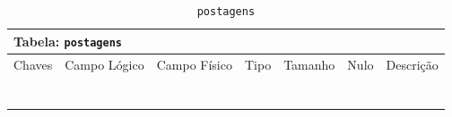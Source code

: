 \documentclass[12pt,a4paper]{article}
\begin{document}
\begin{center}
\begin{table}[h!]
	\caption{\texttt{postagens}}
	\label{tabela:postagens}
	\begin{tabular}{|p{1cm}|p{1.5cm}|p{1.25cm}|p{1.25cm}|p{1.75cm}|p{1.25cm}|p{4.5cm}|}\hline	
		\multicolumn{7}{|p{16cm}|}{\cellcolor{cinzaClaro}  \centering Tabela: \texttt{postagens}} \\ \hline %
		{\small Chaves} & {\small Campo Lógico} & {\small Campo Físico} & {\small Tipo} & {\small Tamanho} & {\small Nulo} & {\small Descrição}\\\hline %
		
		{\tiny } & {\tiny } & {\tiny } & {\tiny } & {\tiny } & {\tiny } &{\tiny }\\\hline
		{\tiny } & {\tiny } & {\tiny } & {\tiny } & {\tiny } & {\tiny } &{\tiny }\\\hline
		{\tiny } & {\tiny } & {\tiny } & {\tiny } & {\tiny } & {\tiny } &{\tiny }\\\hline
		{\tiny } & {\tiny } & {\tiny } & {\tiny } & {\tiny } & {\tiny } &{\tiny }\\\hline
		{\tiny } & {\tiny } & {\tiny } & {\tiny } & {\tiny } & {\tiny } &{\tiny }\\\hline
		{\tiny } & {\tiny } & {\tiny } & {\tiny } & {\tiny } & {\tiny } &{\tiny }\\\hline
		{\tiny } & {\tiny } & {\tiny } & {\tiny } & {\tiny } & {\tiny } &{\tiny }\\\hline
		
			
	\end{tabular}
\end{table}	
\end{center}
\end{document}
